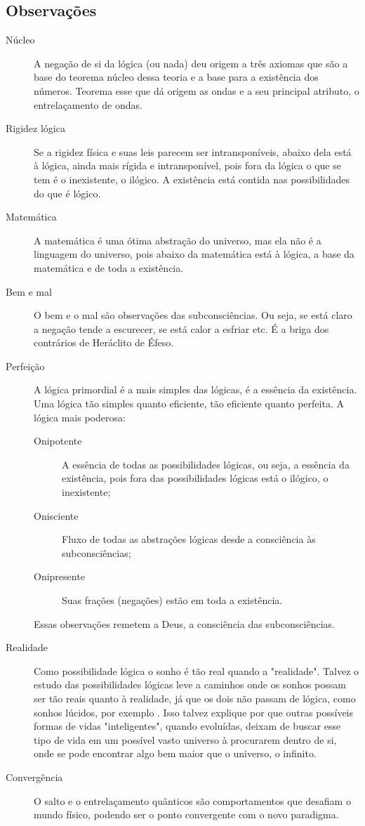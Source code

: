 \subsection{Observações}
	\begin{description}
	   \item[Núcleo] A negação de si da lógica (ou nada) deu origem a três axiomas que são a base do teorema núcleo dessa teoria e a base para a existência dos números. Teorema esse que dá origem as ondas e a seu principal atributo, o entrelaçamento de ondas. 
	   \item[Rigidez lógica] Se a rigidez física e suas leis parecem ser intransponíveis, abaixo dela está à lógica, ainda mais rígida e intransponível, pois fora da lógica o que se tem é o inexistente, o ilógico. A existência está contida nas possibilidades do que é lógico. 
	   \item[Matemática] A matemática é uma ótima abstração do universo, mas ela não é a linguagem do universo, pois abaixo da matemática está à lógica, a base da matemática e de toda a existência.
	   \item[Bem e mal] O bem e o mal são observações das subconsciências. Ou seja, se está claro a negação tende a escurecer, se está calor a esfriar etc. É a briga dos contrários de Heráclito de Éfeso.
	   \item[Perfeição] A lógica primordial é a mais simples das lógicas, é a essência da existência. Uma lógica tão simples quanto eficiente, tão eficiente quanto perfeita. A lógica mais poderosa:
	   \begin{description}
		   \item[Onipotente] A essência de todas as possibilidades lógicas, ou seja, a essência da existência, pois fora das possibilidades lógicas está o ilógico, o inexistente;
		   \item[Onisciente] Fluxo de todas as abstrações lógicas desde a consciência às subconsciências; 
		   \item[Onipresente] Suas frações (negações) estão em toda a existência.
	   \end{description}
	Essas observações remetem a Deus, a consciência das subconsciências.
	   \item[Realidade] Como possibilidade lógica o sonho é tão real quando a "realidade". Talvez o estudo das possibilidades lógicas leve a caminhos onde os sonhos possam ser tão reais quanto à realidade, já que os dois não passam de lógica, como sonhos lúcidos, por exemplo \cite{ administradores_principio_pareto}. Isso talvez explique por que outras possíveis formas de vidas "inteligentes", quando evoluídas, deixam de buscar esse tipo de vida em um possível vasto universo à procurarem dentro de si, onde se pode encontrar algo bem maior que o universo, o infinito.
	   \item[Convergência] O salto e o entrelaçamento quânticos são comportamentos que desafiam o mundo físico, podendo ser o ponto convergente com o novo paradigma.
	\end{description}